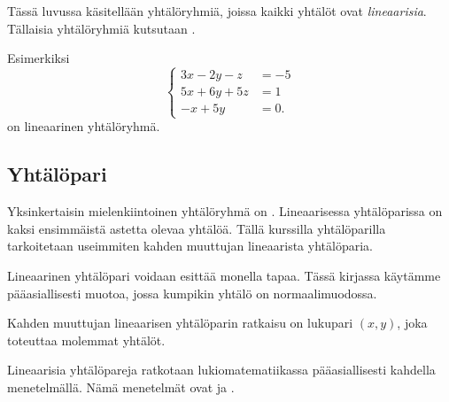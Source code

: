 Tässä luvussa käsitellään yhtälöryhmiä, joissa kaikki yhtälöt ovat \emph{lineaarisia}. 
Tällaisia yhtälöryhmiä kutsutaan .

Esimerkiksi
\[
\left\{
\begin{aligned}
3x-2y-z&= -5 \\
5x+6y+5z&= 1 \\
-x+5y&= 0.
\end{aligned}
\right.
\]
on lineaarinen yhtälöryhmä. 


\subsection*{Yhtälöpari}

Yksinkertaisin mielenkiintoinen yhtälöryhmä on
.
Lineaarisessa yhtälöparissa on kaksi ensimmäistä astetta olevaa yhtälöä.
Tällä kurssilla yhtälöparilla tarkoitetaan useimmiten kahden muuttujan lineaarista yhtälöparia.

Lineaarinen yhtälöpari voidaan esittää monella tapaa. Tässä
kirjassa käytämme pääasiallisesti muotoa, jossa kumpikin yhtälö on normaalimuodossa.


Kahden muuttujan lineaarisen yhtälöparin ratkaisu on lukupari $(x, y)$, joka toteuttaa molemmat yhtälöt.

Lineaarisia yhtälöpareja ratkotaan lukiomatematiikassa pääasiallisesti kahdella menetelmällä.
Nämä menetelmät ovat  ja
.

